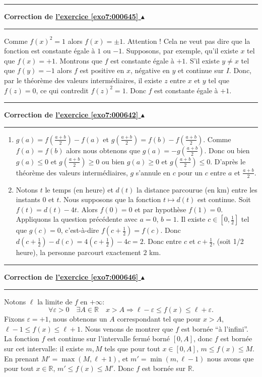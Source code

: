 \documentclass[11pt,a4paper]{article}
\newcommand{\Rr}{\mathbb{R}} \newcommand{\R}{\mathbb{R}}
\renewcommand{\epsilon}{\varepsilon}
\newcounter{exo}
\newcommand{\correction}[1]{\hypertarget{cor7:#1}{}\label{cor7:#1}{\bf Correction de \hyperlink{exo7:#1}{l'exercice \ref{exo7:#1} $\blacktriangle$}}\vspace{1mm}\hrule\vspace{1mm}}
\newcommand{\fincorrection}{\vspace{1mm}\hrule\vspace*{7mm}}
\begin{document}
\fincorrection
\correction{000645}
Comme $f(x)^2 = 1$ alors $f(x) = \pm 1$. 
Attention ! Cela ne veut pas dire que 
la fonction est constante \'egale \`a $1$ ou $-1$.
Supposons, par exemple, qu'il existe $x$ tel que $f(x)=+1$.
Montrons que $f$ est constante \'egale \`a $+1$.
S'il existe $y \not= x$ tel que $f(y) = -1$
alors $f$ est positive en $x$, n\'egative en $y$
et continue sur $I$. Donc, par le th\'eor\`eme des valeurs interm\'ediaires,
il existe $z$ entre $x$ et $y$ tel que $f(z) = 0$, ce qui contredit
$f(z)^2 = 1$. Donc $f$ est constante \'egale \`a $+1$.
\fincorrection
\correction{000642}
\begin{enumerate}
  \item $g(a) = f(\frac{a+b}{2})-f(a)$ et
$g(\frac{a+b}{2}) = f(b) - f(\frac{a+b}{2})$.
Comme $f(a) = f(b)$ alors nous obtenons que $g(a) = -g(\frac{a+b}{2})$.
Donc ou bien $g(a) \leq 0$ et $g(\frac{a+b}{2}) \geq 0$
ou bien $g(a) \geq 0$ et $g(\frac{a+b}{2}) \leq 0$.
D'après le théorème des valeurs intermédiaires, $g$
s'annule en $c$ pour un $c$ entre $a$ et $\frac{a+b}{2}$.
  \item Notons $t$ le temps (en heure) et $d(t)$ la distance parcourue (en km) entre les instants $0$ et $t$.
Nous supposons que la fonction $t \mapsto d(t)$ est continue.
Soit $f(t) = d(t) - 4t$. Alors $f(0) = 0$ et par hypothèse $f(1) = 0$.
Appliquons la question précédente avec $a=0$, $b=1$. 
Il existe $c\in [0,\frac 12]$ tel que $g(c) = 0$, c'est-à-dire
$f(c+\frac12)= f(c)$. Donc $d(c+\frac 12)-d(c) = 4(c+\frac12)-4c = 2$.
Donc entre $c$ et $c+\frac 12$, (soit 1/2 heure), la personne parcourt
exactement $2$ km.
\end{enumerate}
\fincorrection
\correction{000646}
Notons $\ell$ la limite de $f$ en $+\infty$:
$$\forall \epsilon > 0 \quad \exists A \in \Rr
\quad x>A \Rightarrow \ell - \epsilon \leq f(x) \leq \ell + \epsilon.$$
Fixons $\epsilon = +1$, nous obtenons un $A$ correspondant tel que
pour $x>A$, $\ell - 1 \leq f(x) \leq \ell +1$. Nous venons de montrer
que $f$ est born\'ee ``\`a l'infini''.
La fonction $f$ est continue sur l'intervalle ferm\'e born\'e $[0,A]$,
donc $f$ est born\'ee sur cet intervalle: il existe $m,M$ tels que
pour tout $x\in [0,A]$, $m \leq f(x) \leq M$.
En prenant $M' = \max (M,\ell+1)$, et $m' = \min(m,\ell-1)$ nous avons que pour tout $x\in \Rr$,
$m' \leq f(x) \leq M'$. Donc $f$ est born\'ee sur $\Rr$.
\end{document}
